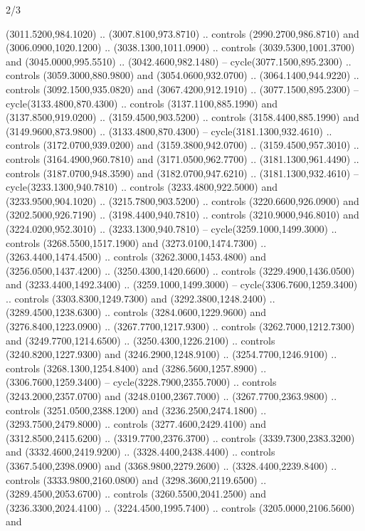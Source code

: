 \begin{flagdescription}{2/3}
\begin{scope}[shift={(0.5\flaglength,0.5)},scale=\flagwidth/130]
\begin{scope}[y=0.01mm, x=0.01mm,shift={(-3365,-2250)}]
  (3011.5200,984.1020) .. (3007.8100,973.8710) .. controls (2990.2700,986.8710)
  and (3006.0900,1020.1200) .. (3038.1300,1011.0900) .. controls
  (3039.5300,1001.3700) and (3045.0000,995.5510) .. (3042.4600,982.1480) --
  cycle(3077.1500,895.2300) .. controls (3059.3000,880.9800) and
  (3054.0600,932.0700) .. (3064.1400,944.9220) .. controls (3092.1500,935.0820)
  and (3067.4200,912.1910) .. (3077.1500,895.2300) -- cycle(3133.4800,870.4300)
  .. controls (3137.1100,885.1990) and (3137.8500,919.0200) ..
  (3159.4500,903.5200) .. controls (3158.4400,885.1990) and (3149.9600,873.9800)
  .. (3133.4800,870.4300) -- cycle(3181.1300,932.4610) .. controls
  (3172.0700,939.0200) and (3159.3800,942.0700) .. (3159.4500,957.3010) ..
  controls (3164.4900,960.7810) and (3171.0500,962.7700) .. (3181.1300,961.4490)
  .. controls (3187.0700,948.3590) and (3182.0700,947.6210) ..
  (3181.1300,932.4610) -- cycle(3233.1300,940.7810) .. controls
  (3233.4800,922.5000) and (3233.9500,904.1020) .. (3215.7800,903.5200) ..
  controls (3220.6600,926.0900) and (3202.5000,926.7190) .. (3198.4400,940.7810)
  .. controls (3210.9000,946.8010) and (3224.0200,952.3010) ..
  (3233.1300,940.7810) -- cycle(3259.1000,1499.3000) .. controls
  (3268.5500,1517.1900) and (3273.0100,1474.7300) .. (3263.4400,1474.4500) ..
  controls (3262.3000,1453.4800) and (3256.0500,1437.4200) ..
  (3250.4300,1420.6600) .. controls (3229.4900,1436.0500) and
  (3233.4400,1492.3400) .. (3259.1000,1499.3000) -- cycle(3306.7600,1259.3400)
  .. controls (3303.8300,1249.7300) and (3292.3800,1248.2400) ..
  (3289.4500,1238.6300) .. controls (3284.0600,1229.9600) and
  (3276.8400,1223.0900) .. (3267.7700,1217.9300) .. controls
  (3262.7000,1212.7300) and (3249.7700,1214.6500) .. (3250.4300,1226.2100) ..
  controls (3240.8200,1227.9300) and (3246.2900,1248.9100) ..
  (3254.7700,1246.9100) .. controls (3268.1300,1254.8400) and
  (3286.5600,1257.8900) .. (3306.7600,1259.3400) -- cycle(3228.7900,2355.7000)
  .. controls (3243.2000,2357.0700) and (3248.0100,2367.7000) ..
  (3267.7700,2363.9800) .. controls (3251.0500,2388.1200) and
  (3236.2500,2474.1800) .. (3293.7500,2479.8000) .. controls
  (3277.4600,2429.4100) and (3312.8500,2415.6200) .. (3319.7700,2376.3700) ..
  controls (3339.7300,2383.3200) and (3332.4600,2419.9200) ..
  (3328.4400,2438.4400) .. controls (3367.5400,2398.0900) and
  (3368.9800,2279.2600) .. (3328.4400,2239.8400) .. controls
  (3333.9800,2160.0800) and (3298.3600,2119.6500) .. (3289.4500,2053.6700) ..
  controls (3260.5500,2041.2500) and (3236.3300,2024.4100) ..
  (3224.4500,1995.7400) .. controls (3205.0000,2106.5600) and

\end{scope}
\end{scope}
\end{flagdescription}

